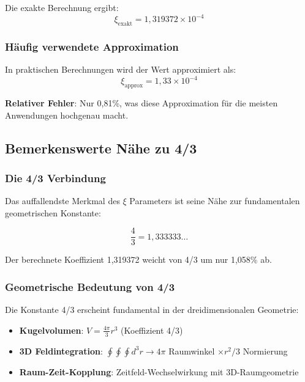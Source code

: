 \documentclass[12pt,a4paper]{article}
\newcommand{\xipar}{\ensuremath{\xi}}
\newcommand{\mypi}{\ensuremath{\pi}}
\newcommand{\mytimes}{\ensuremath{\times}}
\newcommand{\myrightarrow}{\ensuremath{\rightarrow}}
\begin{document}
	Die exakte Berechnung ergibt:
	\begin{equation}
		\xipar_{\text{exakt}} = 1,319372 \mytimes 10^{-4}
		\label{eq:xi_exakt}
	\end{equation}
	
	\subsubsection{Häufig verwendete Approximation}
	\label{subsubsec:approximation}
	
	In praktischen Berechnungen wird der Wert approximiert als:
	\begin{equation}
		\xipar_{\text{approx}} = 1,33 \mytimes 10^{-4}
		\label{eq:xi_approx}
	\end{equation}
	
	\textbf{Relativer Fehler}: Nur 0,81\%, was diese Approximation für die meisten Anwendungen hochgenau macht.
	
	\subsection{Bemerkenswerte Nähe zu 4/3}
	\label{subsec:vier_drittel_naehe}
	
	\subsubsection{Die 4/3 Verbindung}
	\label{subsubsec:vier_drittel_verbindung}
	
	Das auffallendste Merkmal des $\xi$ Parameters ist seine Nähe zur fundamentalen geometrischen Konstante:
	
	\begin{equation}
		\frac{4}{3} = 1,333333\ldots
		\label{eq:vier_drittel}
	\end{equation}
	
	Der berechnete Koeffizient 1,319372 weicht von 4/3 um nur 1,058\% ab.
	
	\subsubsection{Geometrische Bedeutung von 4/3}
	\label{subsubsec:geometrische_bedeutung}
	
	Die Konstante 4/3 erscheint fundamental in der dreidimensionalen Geometrie:
	
	\begin{tcolorbox}[colback=green!5!white,colframe=green!75!black,title=Geometrische Bedeutung von 4/3]
		\begin{itemize}
			\item \textbf{Kugelvolumen}: $V = \frac{4\mypi}{3}r^3$ (Koeffizient 4/3)
			\item \textbf{3D Feldintegration}: $\oint\oint\oint d^3r \myrightarrow 4\mypi$ Raumwinkel $\mytimes r^2/3$ Normierung
			\item \textbf{Raum-Zeit-Kopplung}: Zeitfeld-Wechselwirkung mit 3D-Raumgeometrie
		\end{itemize}
	\end{tcolorbox}
	
\end{document}
